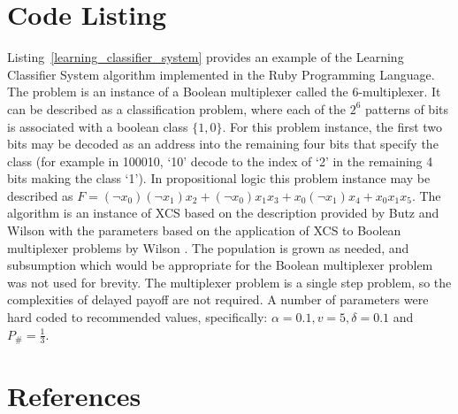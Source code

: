 \documentclass[a4paper, 11pt]{article}
\begin{document}
\section{Code Listing}
\label{sec:code}
Listing~\ref{learning_classifier_system} provides an example of the Learning Classifier System algorithm implemented in the Ruby Programming Language. 
The problem is an instance of a Boolean multiplexer called the 6-multiplexer. It can be described as a classification problem, where each of the $2^6$ patterns of bits is associated with a boolean class $\{1,0\}$. For this problem instance, the first two bits may be decoded as an address into the remaining four bits that specify the class (for example in 100010, `10' decode to the index of `2' in the remaining 4 bits making the class `1'). In propositional logic this problem instance may be described as $F=(\neg x_0) (\neg x_1) x_2 + (\neg x_0) x_1 x_3 + x_0 (\neg x_1) x_4 + x_0 x_1 x_5$. 
The algorithm is an instance of XCS based on the description provided by Butz and Wilson \cite{Butz2002a} with the parameters based on the application of XCS to Boolean multiplexer problems by Wilson \cite{Wilson1995, Wilson1998}.
The population is grown as needed, and subsumption which would be appropriate for the Boolean multiplexer problem was not used for brevity. The multiplexer problem is a single step problem, so the complexities of delayed payoff are not required. A number of parameters were hard coded to recommended values, specifically: $\alpha=0.1, v=5, \delta=0.1$ and $P_{\#}=\frac{1}{3}$.




\section{References}
\label{sec:references}
\end{document}
